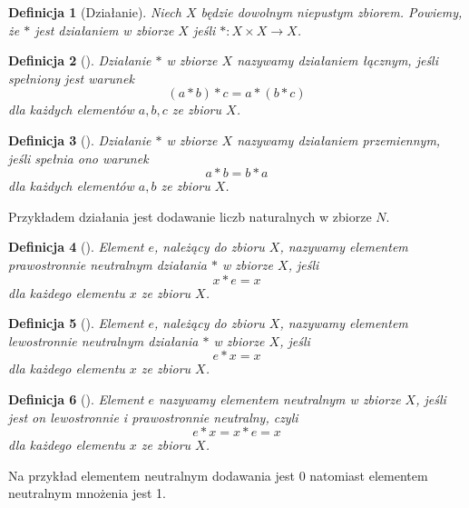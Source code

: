 \documentclass[12pt,a4paper]{report}
\newtheorem{definition}{Definicja}
\begin{document}
\begin{definition}[Działanie]
Niech $X$ będzie dowolnym niepustym zbiorem. Powiemy, że $\ast$ jest działaniem w zbiorze $X$ jeśli $\ast: X \times X \to X$.
\end{definition}


\begin{definition}[\citep{jedrzejewski2011algebra}]
Działanie $\ast$ w zbiorze $X$ nazywamy działaniem łącznym, jeśli spełniony jest warunek 
\begin{equation*}
(a\ast b)\ast c = a\ast(b\ast c)
\end{equation*} 
dla każdych elementów $a,b,c$ ze zbioru $X$.
\end{definition}
\begin{definition}[\citep{jedrzejewski2011algebra}]
Działanie $\ast$ w zbiorze $X$ nazywamy działaniem przemiennym, jeśli spełnia ono warunek
\begin{equation*}
a\ast b=b\ast a
\end{equation*}
dla każdych elementów $a,b$ ze zbioru $X$.
\end{definition}
Przykładem działania jest dodawanie liczb naturalnych w zbiorze $N$.
\begin{definition}[\citep{jedrzejewski2011algebra}]
Element $e$, należący do zbioru $X$, nazywamy elementem prawostronnie neutralnym działania $\ast$ w zbiorze $X$, jeśli
\begin{equation*}
x\ast e = x
\end{equation*} 
dla każdego elementu $x$ ze zbioru $X$.
\end{definition}
\begin{definition}[\citep{jedrzejewski2011algebra}]
Element $e$, należący do zbioru $X$, nazywamy elementem lewostronnie neutralnym działania $\ast$ w zbiorze $X$, jeśli
\begin{equation*}
e\ast x = x
\end{equation*} 
dla każdego elementu $x$ ze zbioru $X$.
\end{definition}
\begin{definition}[\citep{jedrzejewski2011algebra}]
Element $e$ nazywamy elementem neutralnym w zbiorze $X$, jeśli jest on lewostronnie i prawostronnie neutralny, czyli
\begin{equation*}
e\ast x = x\ast e = x
\end{equation*}
dla każdego elementu $x$ ze zbioru $X$.
\end{definition}
Na przykład elementem neutralnym dodawania jest 0 natomiast elementem neutralnym mnożenia jest 1.
\end{document}
